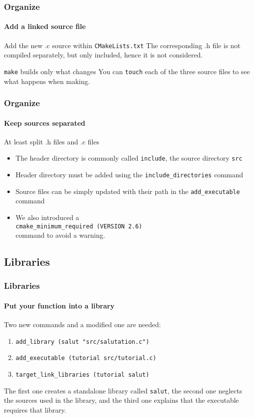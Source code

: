 \begin{frame}
\frametitle{Organize}
\framesubtitle{Add a linked source file}

\begin{block}{Add the new .c source within \texttt{CMakeLists.txt}}
The corresponding .h file is not compiled separately, but only included, hence it is not considered.
\end{block}
\begin{block}{\texttt{make} builds only what changes}
You can \texttt{touch} each of the three source files to see what happens when making.
\end{block}

\end{frame}

\begin{frame}
\frametitle{Organize}
\framesubtitle{Keep sources separated}

\begin{block}{At least split .h files and .c files}
\begin{itemize}
\item The header directory is commonly called \texttt{include}, the source directory \texttt{src}
\item Header directory must be added using the \texttt{include\_directories} command
\item Source files can be simply updated with their path in the \texttt{add\_executable} command
\item We also introduced a \\
\texttt{cmake\_minimum\_required (VERSION 2.6)} \\

command to avoid a warning.
\end{itemize}
\end{block}

\end{frame}

\subsection{Libraries}

\begin{frame}
\frametitle{Libraries}
\framesubtitle{Put your function into a library}

\begin{block}{Two new commands and a modified one are needed:}
\begin{enumerate}
\item \texttt{add\_library (salut "src/salutation.c")}
\item \texttt{add\_executable (tutorial src/tutorial.c)}
\item \texttt{target\_link\_libraries (tutorial salut)}
\end{enumerate}
The first one creates a standalone library called \texttt{salut}, the second one neglects the sources used in the library, and the third one explains that the executable requires that library.
\end{block}

\end{frame}

